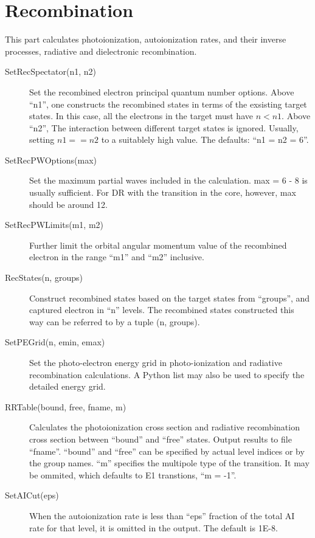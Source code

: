 \documentclass[12pt]{article}
\begin{document}
\section{Recombination}
This part calculates photoionization, autoionization rates, and their inverse
processes, radiative and dielectronic recombination.
\begin{description}
\item[SetRecSpectator(n1, n2)] 
Set the recombined electron principal quantum
number options. Above ``n1'', one constructs the recombined states in terms of
the exsisting target states. In this case, all the electrons in the target
must have $n < n1$. Above ``n2'', The interaction between different target
states is ignored. Usually, setting $n1 == n2$ to a suitablely high value. 
The defaults: ``n1 = n2 = 6''.

\item[SetRecPWOptions(max)] 
Set the maximum partial waves included in the
calculation. max = 6 - 8 is usually sufficient. For DR with the transition in
the core, however, max should be around 12.

\item[SetRecPWLimits(m1, m2)] 
Further limit the orbital angular momentum value of the recombined electron
in the range ``m1'' and ``m2'' inclusive.

\item[RecStates(n, groups)] 
Construct recombined states based on the  target
states from ``groups'', and captured electron in ``n'' levels. The recombined
states constructed this way can be referred to by a tuple (n, groups). 

\item[SetPEGrid(n, emin, emax)] 
Set the photo-electron energy grid in photo-ionization and radiative
recombination calculations. A Python list may also be used to specify the
detailed energy grid. 

\item[RRTable(bound, free, fname, m)] Calculates the photoionization cross
section and radiative recombination cross section between ``bound'' and
``free'' states. Output results to file ``fname''. ``bound'' and ``free'' can
be specified by actual level indices or by the group names. ``m'' specifies
the multipole type of the transition. It may be ommited, which defaults to E1
transtions, ``m = -1''.

\item[SetAICut(eps)] When the autoionization rate is less than ``eps''
fraction of the total AI rate for that level, it is omitted in the output. The
default is 1E-8.


\end{description}
\end{document}
